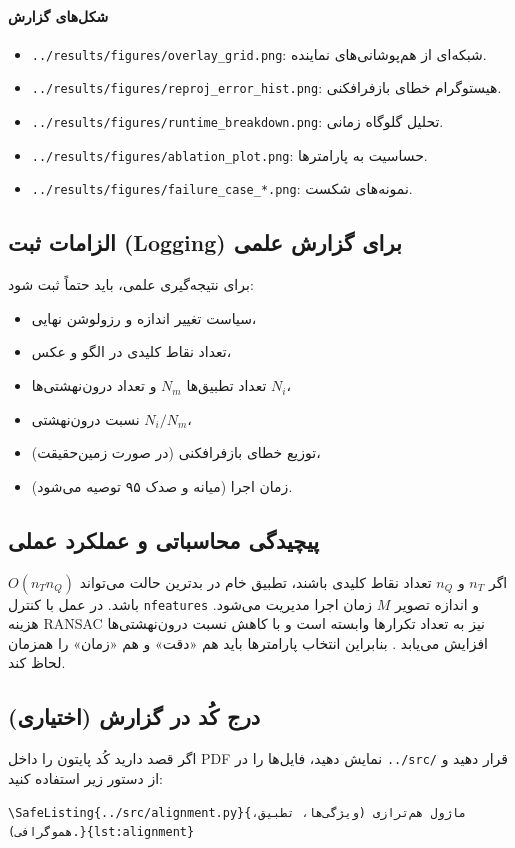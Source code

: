 \paragraph{شکل‌های گزارش}
\begin{itemize}
  \item \texttt{../results/figures/overlay\_grid.png}: شبکه‌ای از هم‌پوشانی‌های نماینده.
  \item \texttt{../results/figures/reproj\_error\_hist.png}: هیستوگرام خطای بازفرافکنی.
  \item \texttt{../results/figures/runtime\_breakdown.png}: تحلیل گلوگاه زمانی.
  \item \texttt{../results/figures/ablation\_plot.png}: حساسیت به پارامترها.
  \item \texttt{../results/figures/failure\_case\_*.png}: نمونه‌های شکست.
\end{itemize}

\subsection{الزامات ثبت (Logging) برای گزارش علمی}
برای نتیجه‌گیری علمی، باید حتماً ثبت شود:
\begin{itemize}
  \item سیاست تغییر اندازه و رزولوشن نهایی،
  \item تعداد نقاط کلیدی در الگو و عکس،
  \item تعداد تطبیق‌ها $N_m$ و تعداد درون‌نهشتی‌ها $N_i$،
  \item نسبت درون‌نهشتی $N_i/N_m$،
  \item (در صورت زمین‌حقیقت) توزیع خطای بازفرافکنی،
  \item زمان اجرا (میانه و صدک ۹۵ توصیه می‌شود).
\end{itemize}

\subsection{پیچیدگی محاسباتی و عملکرد عملی}
اگر $n_T$ و $n_Q$ تعداد نقاط کلیدی باشند، تطبیق خام در بدترین حالت می‌تواند $O(n_T n_Q)$ باشد. در عمل با کنترل \texttt{nfeatures} و اندازه تصویر $M$ زمان اجرا مدیریت می‌شود. هزینه RANSAC نیز به تعداد تکرارها وابسته است و با کاهش نسبت درون‌نهشتی‌ها افزایش می‌یابد \cite{FischlerBolles1981}. بنابراین انتخاب پارامترها باید هم «دقت» و هم «زمان» را همزمان لحاظ کند.

\subsection{درج کُد در گزارش (اختیاری)}
اگر قصد دارید کُد پایتون را داخل PDF نمایش دهید، فایل‌ها را در \texttt{../src/} قرار دهید و از دستور زیر استفاده کنید:
\begin{verbatim}
\SafeListing{../src/alignment.py}{ماژول هم‌ترازی (ویژگی‌ها، تطبیق، هموگرافی).}{lst:alignment}
\end{verbatim}
